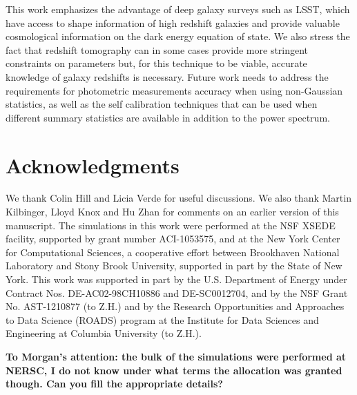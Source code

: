 \documentclass[reprint,aps,prd,superscriptaddress,showkeys,showpacs]{revtex4-1}
\begin{document}
This work emphasizes the advantage of deep galaxy surveys such as LSST, which have access to shape information of high redshift galaxies and provide valuable cosmological information on the dark energy equation of state. We also stress the fact that redshift tomography can in some cases provide more stringent constraints on parameters but, for this technique to be viable, accurate knowledge of galaxy redshifts is necessary. Future work needs to address the requirements for photometric measurements accuracy when using non-Gaussian statistics, as well as the self calibration techniques that can be used when different summary statistics are available in addition to the power spectrum. 


\section*{Acknowledgments}

We thank Colin Hill and Licia Verde for useful discussions. We also thank Martin Kilbinger, Lloyd Knox and Hu Zhan for comments on an earlier version of this manuscript.
The simulations in this work were performed at the NSF XSEDE facility, supported by grant number
ACI-1053575, and at the New York Center for Computational Sciences, a
cooperative effort between Brookhaven National Laboratory and Stony
Brook University, supported in part by the State of New York. This
work was supported in part by the U.S. Department of Energy under
Contract Nos. DE-AC02-98CH10886 and DE-SC0012704, and by the NSF Grant
No. AST-1210877 (to Z.H.) and by the Research Opportunities and
Approaches to Data Science (ROADS) program at the Institute for Data
Sciences and Engineering at Columbia University (to Z.H.).

\textbf{To Morgan's attention: the bulk of the simulations were performed at NERSC, I do not know under what terms the allocation was granted though. Can you fill the appropriate details?}




\label{lastpage}
\end{document}
